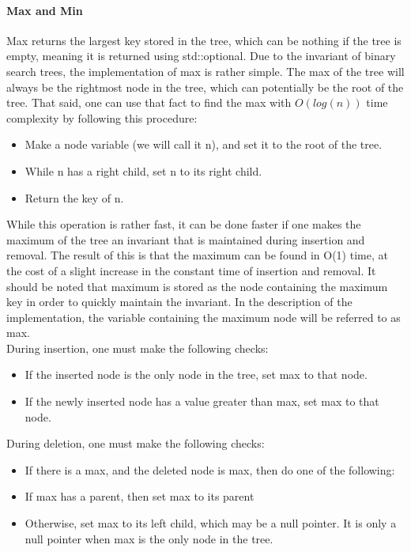 \documentclass{article}
\begin{document}
\paragraph{Max and Min}

\noindent
Max returns the largest key stored in the tree, which can be nothing if the tree is empty, meaning it is returned using std::optional. Due to the invariant of binary search trees, the implementation of max is rather simple. The max of the tree will always be the rightmost node in the tree, which can potentially be the root of the tree. That said, one can use that fact to find the max with $O(log(n))$ time complexity by following this procedure:
\\

\begin{itemize}
    \item Make a node variable (we will call it n), and set it to the root of the tree.
    \item While n has a right child, set n to its right child.
    \item Return the key of n.
\end{itemize}

\noindent
While this operation is rather fast, it can be done faster if one makes the maximum of the tree an invariant that is maintained during insertion and removal. The result of this is that the maximum can be found in O(1) time, at the cost of a slight increase in the constant time of insertion and removal. It should be noted that maximum is stored as the node containing the maximum key in order to quickly maintain the invariant. In the description of the implementation, the variable containing the maximum node will be referred to as max.
\\

\noindent
During insertion, one must make the following checks:

\begin{itemize}
    \item If the inserted node is the only node in the tree, set max to that node.
    \item If the newly inserted node has a value greater than max, set max to that node.
\end{itemize}

\noindent
During deletion, one must make the following checks:
\begin{itemize}
    \item If there is a max, and the deleted node is max, then do one of the following:
    \item If max has a parent, then set max to its parent
    \item Otherwise, set max to its left child, which may be a null pointer. It is only a null pointer when max is the only node in the tree.
\end{itemize}
\end{document}
